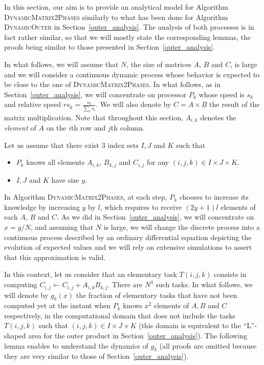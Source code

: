 \documentclass[a4paper,10pt]{article}
\newcommand{\stupid}{\textsc{Dynamic\-Outer}\xspace}
\newcommand{\stupidthresholdmat}{\textsc{Dynamic\-Matrix\-2Phases}\xspace}
\begin{document}
In this section, our aim is to provide an analytical model for
Algorithm \stupidthresholdmat similarly to what has been done for Algorithm \stupid in
Section~\ref{outer_analysis}. The analysis of both processes is in
fact rather similar, so that we will mostly state the corresponding
lemmas, the proofs being similar to those presented in
Section~\ref{outer_analysis}.

In what follows, we will assume that $N$, the size of matrices $A$, $B$
and $C$, is large and we will consider a continuous dynamic process
whose behavior is expected to be close to the one of \stupidthresholdmat. In
what follows, as in Section~\ref{outer_analysis}, we will concentrate
on processor $P_k$ whose speed is $s_k$ and relative speed $\mathit{rs}_k=\frac{s_k}{\sum_i s_i}$. We will also denote by $C=A
\times B$ the result of the matrix multiplication. Note that throughout this section,
$A_{i,k}$ denotes the \emph{element} of $A$ on the $i$th row and $j$th
column.

Let us assume that there exist 3 index sets $I,J$ and $K$ such that 
\begin{itemize}
\item $P_k$ knows all elements $A_{i,k}$, $B_{k,j}$ and $C_{i,j}$ for
  any $(i,j,k)\in I\times J \times K$.
\item $I, J$ and $K$ have size $y$.
\end{itemize}

In Algorithm \stupidthresholdmat, at each step, $P_k$ chooses to increase its
knowledge by increasing $y$ by $l$, which requires to receive $(2  y+1)l$
elements of each $A$, $B$ and $C$. As we did in
Section~\ref{outer_analysis}, we will concentrate on $x=y/N$, and
assuming that $N$ is large, we will change the discrete process into a
continuous process described by an ordinary differential equation
depicting the evolution of expected values and we will rely on
extensive simulations to assert that this approximation is valid.

In this context, let us consider that an elementary task $T(i,j,k)$
consists in computing $C_{i,j} \gets C_{i,j} +A_{i,k} B_{k,j}$. There are $N^3$ such
tasks. In what follows, we will denote by $g_k(x)$ the fraction of
elementary tasks that have not been computed yet at the instant when
$P_k$ knows $x^2$ elements of $A, B$ and $C$ respectively, in the
computational domain that does not include the tasks $T(i,j,k)$ such
that $(i,j,k)\in I\times J \times K$ (this domain is equivalent to the
``L''-shaped area for the outer product in Section~\ref{outer_analysis}). The following lemma enables to
understand the dynamics of $g_k$ (all proofs are omitted because they
are very similar to those of Section~\ref{outer_analysis}).
\end{document}
